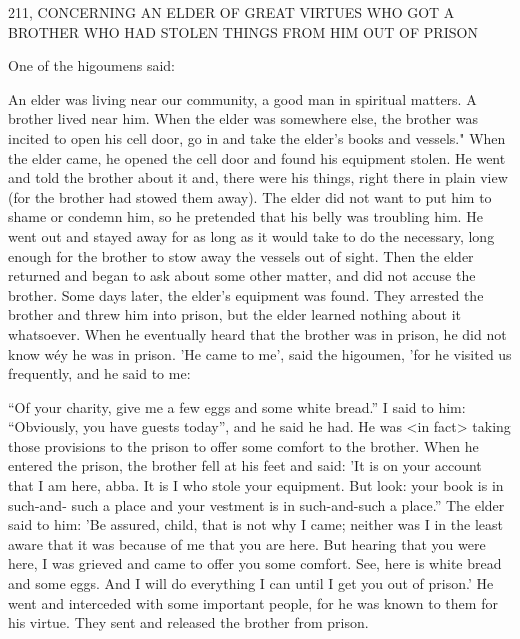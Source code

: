 211, CONCERNING AN ELDER
OF GREAT VIRTUES WHO GOT
A BROTHER WHO HAD STOLEN THINGS
FROM HIM OUT OF PRISON

One of the higoumens said:

An elder was living near our community, a good man in spiritual
matters. A brother lived near him. When the elder was somewhere
else, the brother was incited to open his cell door, go in and take
the elder's books and vessels." When the elder came, he opened the
cell door and found his equipment stolen. He went and told the
brother about it and, there were his things, right there in plain view
(for the brother had stowed them away). The elder did not want to
put him to shame or condemn him, so he pretended that his belly
was troubling him. He went out and stayed away for as long as it
would take to do the necessary, long enough for the brother to stow
away the vessels out of sight. Then the elder returned and began to
ask about some other matter, and did not accuse the brother. Some
days later, the elder's equipment was found. They arrested the
brother and threw him into prison, but the elder learned nothing
about it whatsoever. When he eventually heard that the brother was
in prison, he did not know wéy he was in prison. 'He came to me',
said the higoumen, 'for he visited us frequently, and he said to me:

“Of your charity, give me a few eggs and some white bread.” I said
to him: “Obviously, you have guests today”, and he said he had. He
was <in fact> taking those provisions to the prison to offer some
comfort to the brother. When he entered the prison, the brother fell
at his feet and said: 'It is on your account that I am here, abba. It
is I who stole your equipment. But look: your book is in such-and-
such a place and your vestment is in such-and-such a place.” The
elder said to him: 'Be assured, child, that is not why I came; neither
was I in the least aware that it was because of me that you are here.
But hearing that you were here, I was grieved and came to offer you
some comfort. See, here is white bread and some eggs. And I will
do everything I can until I get you out of prison.' He went and
interceded with some important people, for he was known to them
for his virtue. They sent and released the brother from prison.

